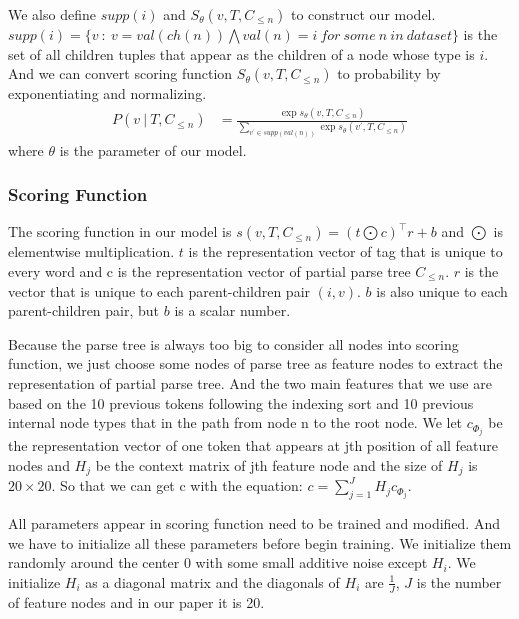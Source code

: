 We also define $supp(i)$ and $S_{\theta}(v,T,C_{\leq n})$ to construct our model. $supp(i) = \{v\ :\ v=val(ch(n)) \bigwedge val(n)=i\ for\ some\ n\ in\ dataset\}$ is the set of all children tuples that appear as the children of a node whose type is $i$. And we can convert scoring function $S_{\theta}(v,T,C_{\leq n})$ to probability by exponentiating and normalizing.
\begin{align}
    P(v\ |\ T,C_{\leq n}) & = \frac{\exp s_{\theta}(v,T,C_{\leq n})}{\sum_{v^{'}\in supp(val(n))}\exp s_{\theta}(v^{'},T,C_{\leq n})}
\end{align}
where $\theta$ is the parameter of our model.

\subsubsection{Scoring Function}
The scoring function in our model is $s(v,T,C_{\leq n}) = (t \bigodot c)^{\top} r + b$ and $\bigodot$ is elementwise multiplication. $t$ is the representation vector of tag that is unique to every word and c is the representation vector of partial parse tree $C_{\leq n}$. $r$ is the vector that is unique to each parent-children pair $(i,v)$. $b$ is also unique to each parent-children pair, but $b$ is a scalar number.

Because the parse tree is always too big to consider all nodes into scoring function, we just choose some nodes of parse tree as feature nodes to extract the representation of partial parse tree. And the two main features that we use are based on the 10 previous tokens following the indexing sort and 10 previous internal node types that in the path from node n to the root node. We let $c_{\varPhi_j}$ be the representation vector of one token that appears at jth position of all feature nodes and $H_j$ be the context matrix of jth feature node and the size of $H_j$ is $20\times20$. So that we can get c with the equation: $c=\sum_{j=1}^{J} H_{j} c_{\varPhi_j}$.

All parameters appear in scoring function need to be trained and modified. And we have to initialize all these parameters before begin training. We initialize them randomly around the center 0 with some small additive noise except $H_i$. We initialize $H_i$ as a diagonal matrix and the diagonals of $H_i$ are $\frac{1}{J} $, $J$ is the number of feature nodes and in our paper it is 20.

